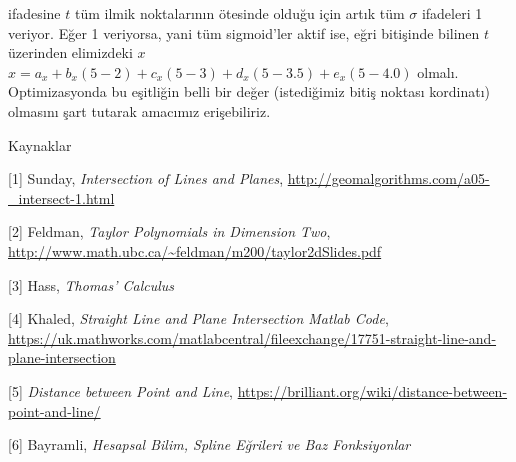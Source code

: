 \documentclass[12pt,fleqn]{article}\usepackage{../../common}
\begin{document}
ifadesine $t$ tüm ilmik noktalarının ötesinde olduğu için artık tüm
$\sigma$ ifadeleri 1 veriyor. Eğer 1 veriyorsa, yani tüm sigmoid'ler aktif
ise, eğri bitişinde bilinen $t$ üzerinden elimizdeki $x$ 
$x = a_x + b_x(5-2) + c_x(5-3) + d_x(5-3.5) + e_x(5-4.0)$
olmalı. Optimizasyonda bu eşitliğin belli bir değer (istediğimiz bitiş
noktası kordinatı) olmasını şart tutarak amacımız erişebiliriz.

Kaynaklar

[1] Sunday, {\em Intersection of Lines and Planes}, 
\url{http://geomalgorithms.com/a05-_intersect-1.html}

[2] Feldman, {\em Taylor Polynomials in Dimension Two},
\url{http://www.math.ubc.ca/~feldman/m200/taylor2dSlides.pdf}

[3] Hass, {\em Thomas' Calculus}

[4] Khaled, {\em Straight Line and Plane Intersection Matlab Code}, 
\url{https://uk.mathworks.com/matlabcentral/fileexchange/17751-straight-line-and-plane-intersection}

[5] {\em Distance between Point and Line}, 
\url{https://brilliant.org/wiki/distance-between-point-and-line/}

[6] Bayramli, {\em Hesapsal Bilim, Spline Eğrileri ve Baz Fonksiyonlar}
\end{document}
